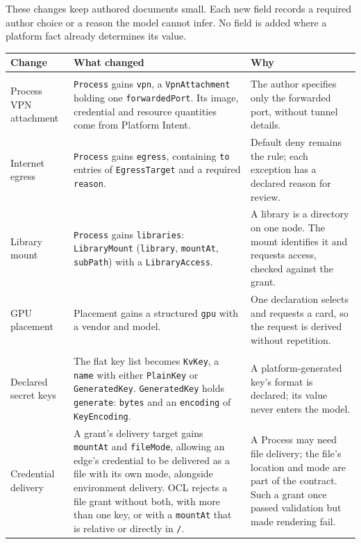 These changes keep authored documents small. Each new field records a required author choice or a reason the model cannot infer. No field is added
where a platform fact already determines its value.

\begin{table}[!htbp]
\centering
\footnotesize
\begin{tabular}{>{\raggedright\arraybackslash}p{}>{\raggedright\arraybackslash}p{}>{\raggedright\arraybackslash}p{}}
\hline
\textbf{Change} & \textbf{What changed} & \textbf{Why} \\
\hline
\multicolumn{3}{l}{\textit{Reaching the platform's services}} \\
Process VPN attachment & \texttt{Process} gains \texttt{vpn}, a \texttt{VpnAttachment} holding one \texttt{forwardedPort}. Its image, credential and resource quantities come from Platform Intent. & The author specifies only the forwarded port, without tunnel details. \\
Internet egress & \texttt{Process} gains \texttt{egress}, containing \texttt{to} entries of \texttt{EgressTarget} and a required \texttt{reason}. & Default deny remains the rule; each exception has a declared reason for review. \\
Library mount & \texttt{Process} gains \texttt{libraries}: \texttt{LibraryMount} (\texttt{library}, \texttt{mountAt}, \texttt{subPath}) with a \texttt{LibraryAccess}. & A library is a directory on one node. The mount identifies it and requests access, checked against the grant. \\
GPU placement & Placement gains a structured \texttt{gpu} with a vendor and model. & One declaration selects and requests a card, so the request is derived without repetition. \\
\multicolumn{3}{l}{\textit{Secrets and keys}} \\
Declared secret keys & The flat key list becomes \texttt{KvKey}, a \texttt{name} with either \texttt{PlainKey} or \texttt{GeneratedKey}. \texttt{GeneratedKey} holds \texttt{generate}: \texttt{bytes} and an \texttt{encoding} of \texttt{KeyEncoding}. & A platform-generated key's format is declared; its value never enters the model. \\
Credential delivery & A grant's delivery target gains \texttt{mountAt} and \texttt{fileMode}, allowing an edge's credential to be delivered as a file with its own mode, alongside environment delivery. OCL rejects a file grant without both, with more than one key, or with a \texttt{mountAt} that is relative or directly in \texttt{/}. & A Process may need file delivery; the file's location and mode are part of the contract. Such a grant once passed validation but made rendering fail. \\

\end{tabular}
\end{table}
